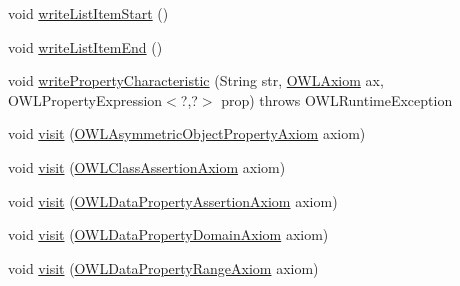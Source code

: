 \begin{DoxyCompactItemize}
void \hyperlink{classuk_1_1ac_1_1manchester_1_1owl_1_1owlapi_1_1tutorialowled2011_1_1_o_w_l_tutorial_syntax_object_renderer_a226b3553a0726fa3d9f2f595043d5be8}{write\-List\-Item\-Start} ()
\item 
void \hyperlink{classuk_1_1ac_1_1manchester_1_1owl_1_1owlapi_1_1tutorialowled2011_1_1_o_w_l_tutorial_syntax_object_renderer_ab1ee7304190449401ec283938580dca9}{write\-List\-Item\-End} ()
\item 
void \hyperlink{classuk_1_1ac_1_1manchester_1_1owl_1_1owlapi_1_1tutorialowled2011_1_1_o_w_l_tutorial_syntax_object_renderer_a87822c4f532c0284fe39ee91ba162de7}{write\-Property\-Characteristic} (String str, \hyperlink{interfaceorg_1_1semanticweb_1_1owlapi_1_1model_1_1_o_w_l_axiom}{O\-W\-L\-Axiom} ax, O\-W\-L\-Property\-Expression$<$?,?$>$ prop)  throws O\-W\-L\-Runtime\-Exception 
\item 
void \hyperlink{classuk_1_1ac_1_1manchester_1_1owl_1_1owlapi_1_1tutorialowled2011_1_1_o_w_l_tutorial_syntax_object_renderer_a7373da95e976f62d423392e724eb3f8e}{visit} (\hyperlink{interfaceorg_1_1semanticweb_1_1owlapi_1_1model_1_1_o_w_l_asymmetric_object_property_axiom}{O\-W\-L\-Asymmetric\-Object\-Property\-Axiom} axiom)
\item 
void \hyperlink{classuk_1_1ac_1_1manchester_1_1owl_1_1owlapi_1_1tutorialowled2011_1_1_o_w_l_tutorial_syntax_object_renderer_a768151239ccfe283db243a37350b4e9c}{visit} (\hyperlink{interfaceorg_1_1semanticweb_1_1owlapi_1_1model_1_1_o_w_l_class_assertion_axiom}{O\-W\-L\-Class\-Assertion\-Axiom} axiom)
\item 
void \hyperlink{classuk_1_1ac_1_1manchester_1_1owl_1_1owlapi_1_1tutorialowled2011_1_1_o_w_l_tutorial_syntax_object_renderer_a083535c3ba2f69160338bf097e44a31e}{visit} (\hyperlink{interfaceorg_1_1semanticweb_1_1owlapi_1_1model_1_1_o_w_l_data_property_assertion_axiom}{O\-W\-L\-Data\-Property\-Assertion\-Axiom} axiom)
\item 
void \hyperlink{classuk_1_1ac_1_1manchester_1_1owl_1_1owlapi_1_1tutorialowled2011_1_1_o_w_l_tutorial_syntax_object_renderer_a89432bb9b05225608ab78c890bd5fedd}{visit} (\hyperlink{interfaceorg_1_1semanticweb_1_1owlapi_1_1model_1_1_o_w_l_data_property_domain_axiom}{O\-W\-L\-Data\-Property\-Domain\-Axiom} axiom)
\item 
void \hyperlink{classuk_1_1ac_1_1manchester_1_1owl_1_1owlapi_1_1tutorialowled2011_1_1_o_w_l_tutorial_syntax_object_renderer_a523ec077ad2978a9c8b96562329f8d49}{visit} (\hyperlink{interfaceorg_1_1semanticweb_1_1owlapi_1_1model_1_1_o_w_l_data_property_range_axiom}{O\-W\-L\-Data\-Property\-Range\-Axiom} axiom)

\end{DoxyCompactItemize}
